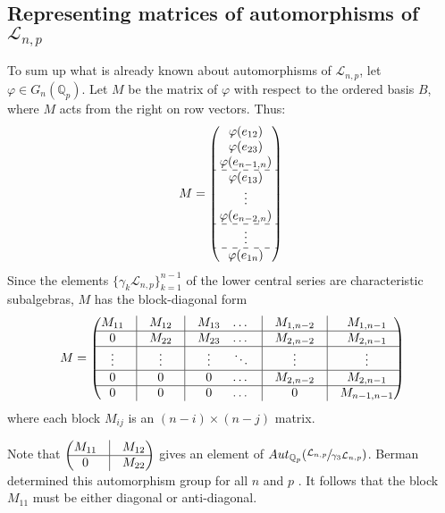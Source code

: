 \documentclass[12pt]{article}
\begin{document}
\subsection{Representing matrices of automorphisms of $\mathcal{L}_{n,p}$}
To sum up what is already known about automorphisms of $\mathcal{L}_{n,p}$, let $\varphi\in{G_{n}}(\mathbb{Q}_p)$. Let $M$ be the matrix of $\varphi$ with respect to the ordered basis $B$, where $M$ acts from the right on row vectors.  Thus:
\[
M=\begin{pmatrix}
\varphi(e_{12})\\
\varphi(e_{23})\\
\varphi(e_{n-1,n})\\
\hdashline
\varphi(e_{13})\\
\vdots\\
\varphi(e_{n-2,n})\\
\hdashline
\vdots\\
\hdashline
\varphi(e_{1n})\\
\end{pmatrix}\\
\]
Since the elements $\{\gamma_{k}\mathcal{L}_{n,p}\}_{k=1}^{n-1}$ of the lower central series are characteristic subalgebras, $M$ has the block-diagonal form
\[M=\begin{pmatrix}
M_{11}&\vline&M_{12}&\vline& M_{13}
&\dots&\vline&M_{1,n-2}&\vline&M_{1,n-1}\\
\hline
0&\vline&M_{22}&\vline&M_{23}&\dots&\vline 
&M_{2,n-2} &\vline& M_{2,n-1}\\
\hline
\vdots & \vline & \vdots&\vline & \vdots & \ddots &\vline & \vdots &\vline& \vdots\\
\hline
0 & \vline & 0&\vline & 0 & \dots &\vline & M_{2,n-2} &\vline& M_{2,n-1}\\
\hline
0 & \vline & 0 &\vline & 0 & \dots &\vline & 0 &\vline& M_{n-1,n-1}\\
\end{pmatrix}
\]
where each block $M_{ij}$ is an $(n-i)\times{(n-j)}$ matrix.\par
Note that $\begin{pmatrix}
M_{11} & \vline & M_{12}\\
\hline
0 & \vline & M_{22}\\
\end{pmatrix}$ gives an element of $Aut_{\mathbb{Q}_{p}}(\sfrac{\mathcal{L}_{n,p}}{\gamma_{3}\mathcal{L}_{n,p}})$. Berman determined this automorphism group for all $n$ and $p$ \cite[Prop. 3.6]{Berman}. It follows that the block $M_{11}$ must be either diagonal or anti-diagonal.
\end{document}
